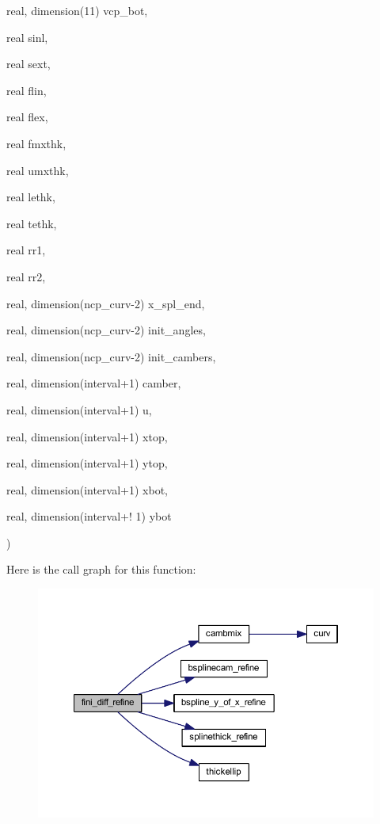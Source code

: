{\begin{DoxyParamCaption}
\item[{real, dimension(11)}]{vcp\+\_\+bot, }
\item[{real}]{sinl, }
\item[{real}]{sext, }
\item[{real}]{flin, }
\item[{real}]{flex, }
\item[{real}]{fmxthk, }
\item[{real}]{umxthk, }
\item[{real}]{lethk, }
\item[{real}]{tethk, }
\item[{real}]{rr1, }
\item[{real}]{rr2, }
\item[{real, dimension(ncp\+\_\+curv-\/2)}]{x\+\_\+spl\+\_\+end, }
\item[{real, dimension(ncp\+\_\+curv-\/2)}]{init\+\_\+angles, }
\item[{real, dimension(ncp\+\_\+curv-\/2)}]{init\+\_\+cambers, }
\item[{real, dimension(interval+1)}]{camber, }
\item[{real, dimension(interval+1)}]{u, }
\item[{real, dimension(interval+1)}]{xtop, }
\item[{real, dimension(interval+1)}]{ytop, }
\item[{real, dimension(interval+1)}]{xbot, }
\item[{real, dimension(interval+! 1)}]{ybot}
\end{DoxyParamCaption}
)}\label{lespline_8f90_a7128d571695c622aff1e7e1cd5ce4619}


Here is the call graph for this function\+:
\nopagebreak
\begin{figure}[H]
\begin{center}
\leavevmode
\includegraphics[width=350pt]{lespline_8f90_a7128d571695c622aff1e7e1cd5ce4619_cgraph}
\end{center}
\end{figure}




